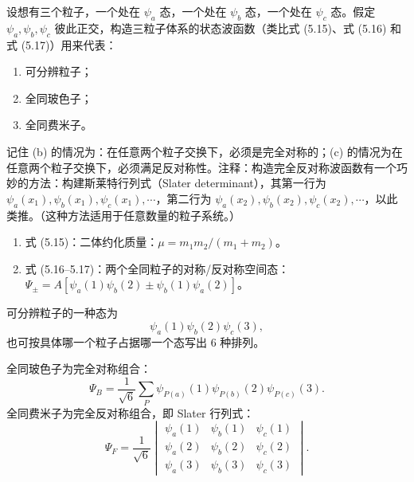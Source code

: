 \begin{question}
设想有三个粒子，一个处在 $\psi_a$ 态，一个处在 $\psi_b$ 态，一个处在 $\psi_c$ 态。假定 $\psi_a,\psi_b,\psi_c$ 彼此正交，构造三粒子体系的状态波函数（类比式 (5.15)、式 (5.16) 和式 (5.17)）用来代表：
\begin{enumerate}
\item 可分辨粒子；
\item 全同玻色子；
\item 全同费米子。
\end{enumerate}
记住 (b) 的情况为：在任意两个粒子交换下，必须是完全对称的；(c) 的情况为在任意两个粒子交换下，必须满足反对称性。注释：构造完全反对称波函数有一个巧妙的方法：构建斯莱特行列式（Slater determinant），其第一行为 $\psi_a(x_1),\psi_b(x_1),\psi_c(x_1),\cdots$，第二行为 $\psi_a(x_2),\psi_b(x_2),\psi_c(x_2),\cdots$，以此类推。（这种方法适用于任意数量的粒子系统。）

\par\smallskip
{}
\begin{enumerate}[leftmargin=2.2em,itemsep=0.12em,topsep=0.12em,parsep=0pt]
\item 式 (5.15)：二体约化质量：$\mu=m_1m_2/(m_1+m_2)$。
\item 式 (5.16--5.17)：两个全同粒子的对称/反对称空间态：$\Psi_\pm=A[\psi_a(1)\psi_b(2)\pm\psi_b(1)\psi_a(2)]$。
\end{enumerate}

\end{question}
\begin{solution}

可分辨粒子的一种态为
\[
\psi_a(1)\psi_b(2)\psi_c(3),
\]
也可按具体哪一个粒子占据哪一个态写出 6 种排列。

全同玻色子为完全对称组合：
\[
\Psi_B=\frac1{\sqrt6}\sum_{P}\psi_{P(a)}(1)\psi_{P(b)}(2)\psi_{P(c)}(3).
\]
全同费米子为完全反对称组合，即 Slater 行列式：
\[
\Psi_F=\frac1{\sqrt{6}}
\begin{vmatrix}
\psi_a(1)&\psi_b(1)&\psi_c(1)\\
\psi_a(2)&\psi_b(2)&\psi_c(2)\\
\psi_a(3)&\psi_b(3)&\psi_c(3)
\end{vmatrix}.
\]

\end{solution}

